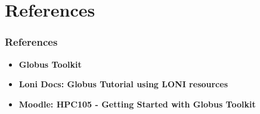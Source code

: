 \documentclass[slidestop,mathserif,compress,xcolor=svgnames]{beamer}
\begin{document}
\section{References}
\begin{frame}
 \frametitle{{\small References}}
\begin{block}{}
\begin{itemize}
 \item \footnotesize{{\bf Globus Toolkit}\\}
 \item \footnotesize{{\bf Loni Docs: Globus Tutorial using LONI resources}\\}
 \item \footnotesize{{\bf Moodle: HPC105 - Getting Started with Globus Toolkit}\\}
\end{itemize}
\end{block}

\end{frame}
\end{document}
